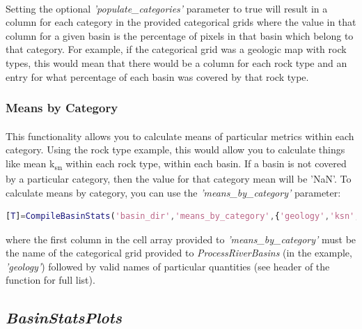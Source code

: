 \paragraph{}Setting the optional \textit{'populate\_categories'} parameter to true will result in a column for each category in the provided categorical grids where the value in that column for a given basin is the percentage of pixels in that basin which belong to that category. For example, if the categorical grid was a geologic map with rock types, this would mean that there would be a column for each rock type and an entry for what percentage of each basin was covered by that rock type.

\subsubsection{Means by Category}
\paragraph{}This functionality allows you to calculate means of particular metrics within each category. Using the rock type example, this would allow you to calculate things like mean k\textsubscript{sn} within each rock type, within each basin. If a basin is not covered by a particular category, then the value for that category mean will be 'NaN'. To calculate means by category, you can use the \textit{'means\_by\_category'} parameter:

\begin{lstlisting}[language=Matlab]
% To calculate means using the geology additional grid for ksn and 2500 m local relief
[T]=CompileBasinStats('basin_dir','means_by_category',{'geology','ksn','rlf2500'});
\end{lstlisting}

\noindent
where the first column in the cell array provided to \textit{'means\_by\_category'} must be the name of the categorical grid provided to \textit{ProcessRiverBasins} (in the example, \textit{'geology'}) followed by valid names of particular quantities (see header of the function for full list).

\subsection{\textit{BasinStatsPlots}} \label{sec:BSPlots}

